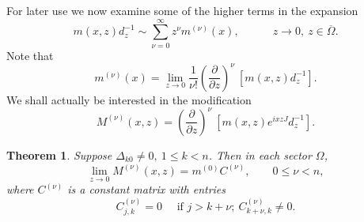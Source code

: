 \documentclass{surv-l}
\theoremstyle{plain}
\newtheorem{theorem}{Theorem}[section]
\theoremstyle{definition}
\numberwithin{equation}{chapter}
\begin{document}
For later use we now examine some of the higher terms in the expansion
\setcounter{equation}{25}
\begin{equation}\label{eq8.26}
m(x,z)d_{z}^{-1}\sim\sum_{\nu=0}^{\infty}z^{\nu}m^{(\nu)}(x),\qquad\quad z\rightarrow 0,\ z\in\overline{\Omega}.
\end{equation}
Note that
\begin{equation*}
m^{(\nu)}(x)=\lim_{z\rightarrow 0}\frac{1}{\nu!}\left(\frac{\partial}{\partial z}\right)^{\nu}\ [m(x,z)d_{z}^{-1}].
\end{equation*}
We shall actually be interested in the modification
\begin{equation}\label{eq8.27}
M^{(\nu)}(x,z) = \left(\frac{\partial}{\partial z}\right)^{\nu}\ [m(x,z)e^{ixzJ}d_{z}^{-1}].
\end{equation}
\setcounter{theorem}{27}
\begin{theorem}\label{thm8.28} Suppose $\Delta_{k0}\neq 0,\ 1\leq k<n$. Then in each sector $\Omega$,
\setcounter{equation}{28}
\begin{equation}\label{eq8.29}
\lim_{z\rightarrow 0}M^{(\nu)}(x, z) = m^{(0)}C^{(\nu)},\qquad0\leq \nu <n,
\end{equation}
where $C^{(\nu)}$ is a constant matrix with entries
\begin{equation}\label{eq8.30}
C_{j,k}^{(\nu)} = 0\quad \text{ if } j > k +\nu;\ C_{k+\nu,k}^{(\nu)}\neq 0.
\end{equation}
\end{theorem}
\end{document}

